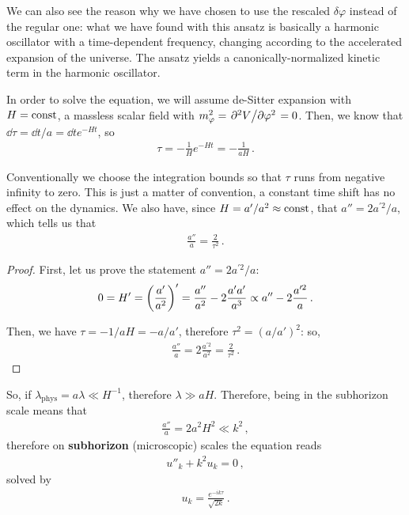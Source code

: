 \documentclass[main.tex]{subfiles}
\begin{document}
We can also see the reason why we have chosen to use the rescaled \(\delta \varphi \) instead of the regular one: what we have found with this ansatz is basically a harmonic oscillator with a time-dependent frequency, changing according to the accelerated expansion of the universe. 
The ansatz yields a canonically-normalized kinetic term in the harmonic oscillator. 

In order to solve the equation, we will assume de-Sitter expansion with \(H = \text{const}\), a massless scalar field with \(m_\varphi^2 = \pdv*[2]{V}{\varphi } = 0\). 
Then, we know that \(\dd{\tau } = \dd{t} / a = \dd{t} e^{-Ht}\), so 
%
\begin{align}
\tau = - \frac{1}{H} e^{-Ht} = - \frac{1}{aH}
\,.
\end{align}

Conventionally we choose the integration bounds so that \(\tau \) runs from negative infinity to zero. This is just a matter of convention, a constant time shift has no effect on the dynamics.
We also have, since \(H = a' / a^2 \approx \text{const}\), that \(a'' = 2 a^{\prime 2} / a\), which tells us that
%
\begin{align}
\frac{a''}{a} = \frac{2}{\tau^2}
\,.
\end{align}

\begin{proof}
First, let us prove the statement \(a'' = 2 a^{\prime 2} / a\): 
%
\begin{align}
0 = H' = \qty( \frac{a'}{a^2})' = \frac{a''}{a^2} - 2 \frac{a' a'}{a^3} 
\propto a'' - 2 \frac{a^{\prime 2}}{a}
\,.
\end{align}

Then, we have \(\tau = - 1 / aH = - a / a'\), therefore \(\tau^2 = (a / a')^2\): so, 
%
\begin{align}
\frac{a''}{a} = 2 \frac{a^{\prime 2}}{a^2} = \frac{2}{\tau^2}
\,.
\end{align}
\end{proof}

So, if \(\lambda _{\text{phys}} = a \lambda \ll H^{-1}\), therefore \(\lambda \gg aH\). Therefore, being in the subhorizon scale means that 
%
\begin{align}
\frac{a''}{a} = 2 a^2 H^2 \ll k^2
\,,
\end{align}
%
therefore on \textbf{subhorizon} (microscopic) scales the equation reads 
%
\begin{align}
u''_k + k^2 u_k = 0
\,,
\end{align}
%
solved by 
%
\begin{align}
u_k = \frac{e^{-ik \tau }}{\sqrt{2 k }}
\,.
\end{align}
\end{document}
